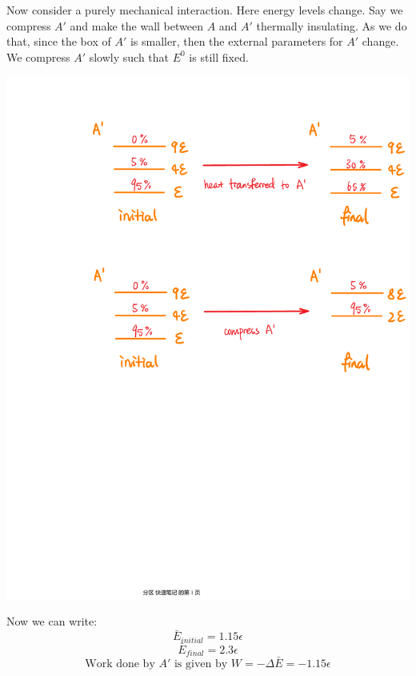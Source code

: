 \documentclass[11pt,oneside]{book}
\theoremstyle{break}
\theoremstyle{break}
\begin{document}
Now consider a purely mechanical interaction. Here energy levels change. Say we compress $A'$ and make the wall between $A$ and $A'$ thermally insulating. As we do that, since the box of $A'$ is smaller, then the external parameters for $A'$ change. We compress $A'$ slowly such that $E^0$ is still fixed. 
\begin{center}
\includegraphics[scale=0.5]{mechanicalInteraction.pdf}
\end{center}
Now we can write:
$$\bar{E}_{initial} = 1.15\epsilon$$
$$\bar{E}_{final} = 2.3\epsilon$$
$$\text{Work done by }A' \text{ is given by }W = -\Delta \bar{E} = -1.15\epsilon$$
\end{document}

